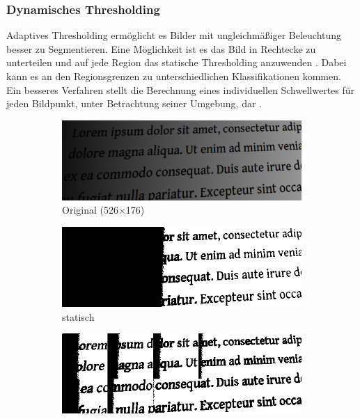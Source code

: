 \subsubsection*{Dynamisches Thresholding}
Adaptives Thresholding ermöglicht es Bilder mit ungleichmäßiger Beleuchtung besser zu Segmentieren.
Eine Möglichkeit ist es das Bild in Rechtecke zu unterteilen und auf jede Region das statische Thresholding anzuwenden \cite[Kap.~4.4,~S.~88--89]{davies2012}.
Dabei kann es an den Regionsgrenzen zu unterschiedlichen Klassifikationen kommen.
Ein besseres Verfahren stellt die Berechnung eines individuellen Schwellwertes für jeden Bildpunkt, unter Betrachtung seiner Umgebung, dar \cite[Kap.~4.4.2]{davies2012}.

\begin{figure}[H]
  \label{fig:segmentation}
  \centering
  \begin{subfigure}{0.49\linewidth}
    \centering
    \includegraphics[width=\linewidth]{img/basics/segmentation/original}
    \caption{Original (526$\times$176)}
  \end{subfigure}
  \begin{subfigure}{0.49\linewidth}
    \centering
    \includegraphics[width=\linewidth]{img/basics/segmentation/global}
    \caption{statisch}
  \end{subfigure}
  \begin{subfigure}{0.49\linewidth}
    \centering
    \includegraphics[width=\linewidth]{img/basics/segmentation/local}

\end{subfigure}
\end{figure}
